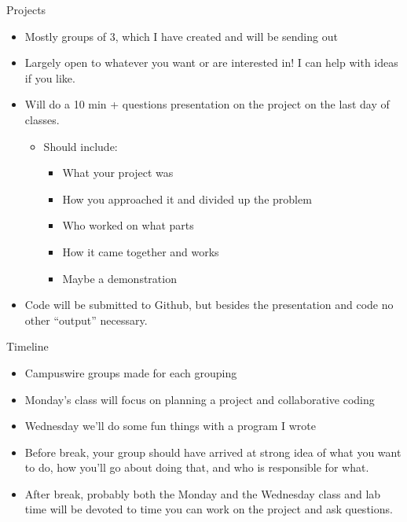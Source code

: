 \documentclass[pdf, aspectratio=169, 12pt]{beamer}
\begin{document}
\begin{frame}{Projects}
	\begin{itemize}
		\item Mostly groups of 3, which I have created and will be sending out
		\item Largely open to whatever you want or are interested in! I can help with ideas if you like.
		\item Will do a 10 min + questions presentation on the project on the last day of classes.
			\begin{itemize}
				\item Should include:
					\begin{itemize}
						\item What your project was
						\item How you approached it and divided up the problem
						\item Who worked on what parts
						\item How it came together and works
						\item Maybe a demonstration
					\end{itemize}
			\end{itemize}
		\item Code will be submitted to Github, but besides the presentation and code no other ``output'' necessary.
	\end{itemize}
\end{frame}

\begin{frame}{Timeline}
	\begin{itemize}
		\item Campuswire groups made for each grouping
		\item Monday's class will focus on planning a project and collaborative coding
		\item Wednesday we'll do some fun things with a program I wrote
		\item Before break, your group should have arrived at strong idea of what you want to do, how you'll go about doing that, and who is responsible for what.
		\item After break, probably both the Monday and the Wednesday class and lab time will be devoted to time you can work on the project and ask questions.
	\end{itemize}
\end{frame}
\end{document}
